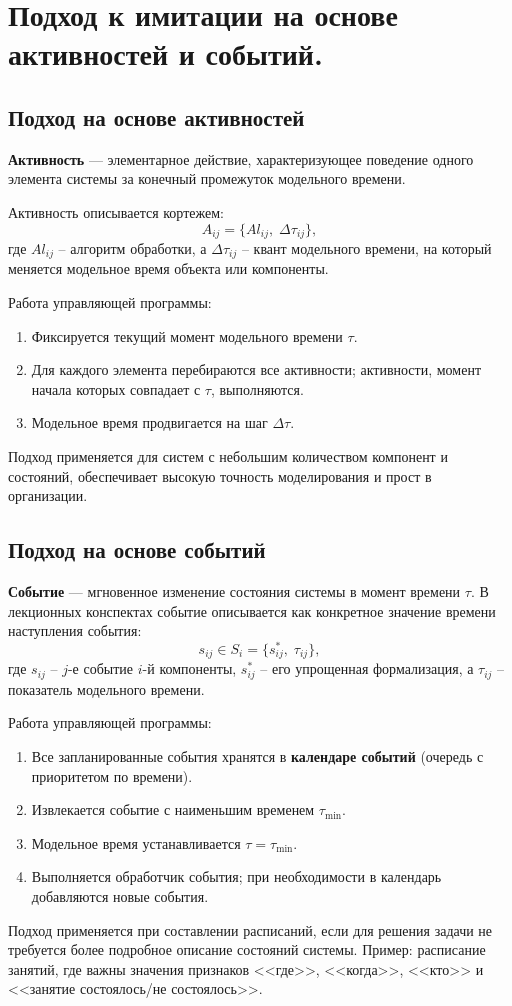 \section{Подход к имитации на основе активностей и событий.}

\subsection*{Подход на основе активностей}

\textbf{Активность} — элементарное действие, характеризующее поведение одного элемента системы за конечный промежуток модельного времени.

Активность описывается кортежем:
\[
  A_{ij} = \bigl\{Al_{ij},\; \Delta\tau_{ij}\bigr\},
\]
где $Al_{ij}$ -- алгоритм обработки, а $\Delta\tau_{ij}$ -- квант модельного времени, на который меняется модельное время объекта или компоненты.

Работа управляющей программы:
\begin{enumerate}
  \item Фиксируется текущий момент модельного времени $\tau$.
  \item Для каждого элемента перебираются все активности; активности, момент начала которых совпадает с $\tau$, выполняются.
  \item Модельное время продвигается на шаг $\Delta\tau$.
\end{enumerate}

Подход применяется для систем с небольшим количеством компонент и состояний, обеспечивает высокую точность моделирования и прост в организации.

\subsection*{Подход на основе событий}

\textbf{Событие} — мгновенное изменение состояния системы в момент времени $\tau$. В лекционных конспектах событие описывается как конкретное значение времени наступления события:
\[
  s_{ij} \in S_i = \bigl\{s^*_{ij},\; \tau_{ij}\bigr\},
\]
где $s_{ij}$ -- $j$-е событие $i$-й компоненты, $s^*_{ij}$ -- его упрощенная формализация, а $\tau_{ij}$ -- показатель модельного времени.

Работа управляющей программы:
\begin{enumerate}
  \item Все запланированные события хранятся в \textbf{календаре событий} (очередь с приоритетом по времени).
  \item Извлекается событие с наименьшим временем $\tau_{\min}$.
  \item Модельное время устанавливается $\tau = \tau_{\min}$.
  \item Выполняется обработчик события; при необходимости в календарь добавляются новые события.
\end{enumerate}

Подход применяется при составлении расписаний, если для решения задачи не требуется более подробное описание состояний системы. Пример: расписание занятий, где важны значения признаков <<где>>, <<когда>>, <<кто>> и <<занятие состоялось/не состоялось>>.

\clearpage
